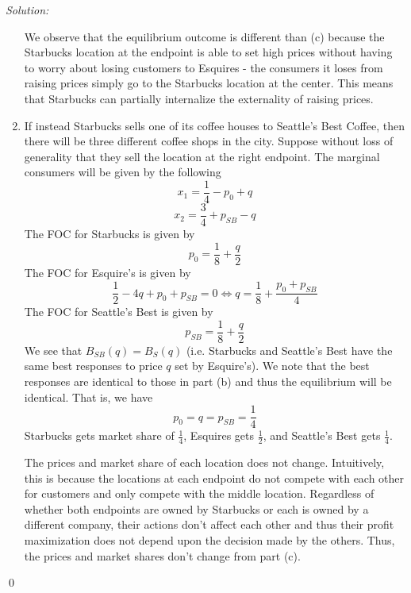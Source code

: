\documentclass[12pt]{article}
\newenvironment{problem}[2][Problem]{\begin{trivlist}
\item[\hskip \labelsep {\bfseries #1}\hskip \labelsep {\bfseries #2.}]}{\end{trivlist}}
\newenvironment{sol}
    {\emph{Solution:}
    }
    {
    \qed
    }
\begin{document}
\begin{sol}
\begin{enumerate}[label=\alph*) ]
         We observe that the equilibrium outcome is different than (c) because the Starbucks location at the endpoint is able to set high prices without having to worry about losing customers to Esquires - the consumers it loses from raising prices simply go to the Starbucks location at the center. This means that Starbucks can partially internalize the externality of raising prices. 
         \item If instead Starbucks sells one of its coffee houses to Seattle's Best Coffee, then there will be three different coffee shops in the city. Suppose without loss of generality that they sell the location at the right endpoint. The marginal consumers will be given by the following
         \[x_1 = \frac{1}{4} - p_0 + q\]
         \[x_2 = \frac{3}{4} + p_{SB} - q\]
         The FOC for Starbucks is given by
         \[p_0 = \frac{1}{8} + \frac{q}{2}\]
         The FOC for Esquire's is given by
         \[\frac{1}{2} - 4q + p_0 + p_{SB} = 0 \iff q = \frac{1}{8} + \frac{p_0 + p_{SB}}{4}\]
         The FOC for Seattle's Best is given by
         \[p_{SB} = \frac{1}{8} + \frac{q}{2}\]
         We see that $B_{SB}(q) = B_{S}(q) $ (i.e. Starbucks and Seattle's Best have the same best responses to price $q$ set by Esquire's). We note that the best responses are identical to those in part (b) and thus the equilibrium will be identical. That is, we have 
         \[p_{0} = q = p_{SB} = \frac{1}{4}\]
         Starbucks gets market share of $\frac{1}{4}$, Esquires gets $\frac{1}{2}$, and Seattle's Best gets $\frac{1}{4}$.

         The prices and market share of each location does not change. Intuitively, this is because the locations at each endpoint do not compete with each other for customers and only compete with the middle location. Regardless of whether both endpoints are owned by Starbucks or each is owned by a different company, their actions don't affect each other and thus their profit maximization does not depend upon the decision made by the others. Thus, the prices and market shares don't change from part (c).
    \end{enumerate}


\end{sol}
\begin{problem}{2}
\end{problem}
\end{document}
